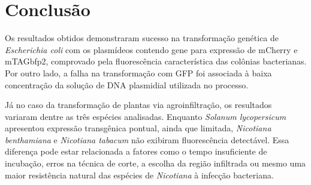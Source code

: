 \section{Conclusão}
Os resultados obtidos demonstraram sucesso na transformação
genética de \textit{Escherichia coli} com os plasmídeos contendo gene para
expressão de  mCherry e
mTAGbfp2, comprovado pela fluorescência característica das colônias bacterianas.
Por outro lado, a falha na transformação com GFP foi associada à baixa
concentração da solução de DNA plasmidial utilizada no processo.

Já no caso da
transformação de plantas via agroinfiltração, os resultados variaram
dentre as três espécies analisadas. Enquanto \textit{Solanum
lycopersicum} apresentou expressão transgênica pontual, ainda que limitada,
\textit{Nicotiana benthamiana} e \textit{Nicotiana tabacum} não exibiram
fluorescência detectável.  Essa diferença pode estar relacionada a fatores como
o tempo insuficiente de incubação, erros na técnica de corte,  a escolha da
região infiltrada ou mesmo uma maior resistência natural das espécies de
\textit{Nicotiana} à infecção bacteriana.

